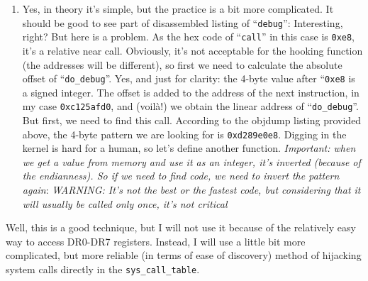\documentclass[12pt]{article}
\begin{document}
\begin{enumerate}
   \item Yes, in theory it's simple, but the practice is a bit more
     complicated. It should be good to see part of disassembled listing of
     ``\verb!debug!'':
      Interesting, right? But here is a problem. As the
     hex code of ``\verb!call!'' in this case is \verb!0xe8!, it's a relative
     near call. Obviously, it's not acceptable for the hooking function (the
     addresses will be different), so first we need to calculate the absolute
     offset of ``\verb!do_debug!''. Yes, and just for clarity: the 4-byte
     value after ``\verb!0xe8! is a signed integer. The offset is added to the
     address of the next instruction, in my case \verb!0xc125afd0!, and
     (voilà!) we obtain the linear address of ``\verb!do_debug!''. But first,
     we need to find this call. According to the objdump listing provided
     above, the 4-byte pattern we are looking for is
     \verb!0xd289e0e8!. Digging in the kernel is hard for a human, so let's
     define another function.  \emph{Important: when we get a value from
       memory and use it as an integer, it's inverted (because of the
       endianness). So if we need to find code, we need to invert the pattern
       again}:  \emph{WARNING: It's not the best or
       the fastest code, but considering that it will usually be called only
       once, it's not critical}
  \end{enumerate}
  Well, this is a good technique, but I will not use it because of the
  relatively easy way to access DR0-DR7 registers. Instead, I will use a
  little bit more complicated, but more reliable (in terms of ease of
  discovery) method of hijacking system calls directly in the
  \verb!sys_call_table!.
\end{document}

